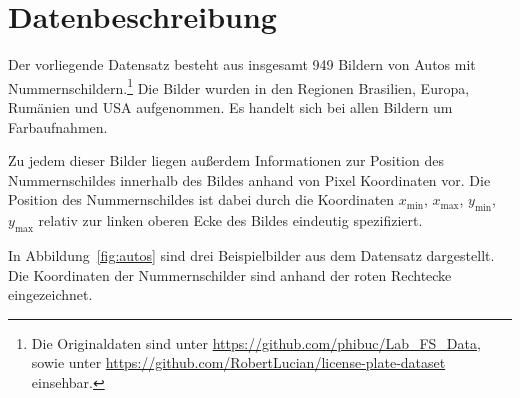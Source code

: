 \section{Datenbeschreibung}
\label{sec:Datenbeschreibung}

Der vorliegende Datensatz besteht aus insgesamt 949 Bildern von Autos mit
Nummernschildern.\footnote{Die Originaldaten sind unter \url{https://github.com/phibuc/Lab_FS_Data},
    sowie unter \url{https://github.com/RobertLucian/license-plate-dataset}
    einsehbar.}
Die Bilder wurden in den Regionen Brasilien, Europa, Rum\"anien und USA
aufgenommen. Es handelt sich bei allen Bildern um Farbaufnahmen.

Zu jedem dieser Bilder liegen au{\ss}erdem Informationen zur Position
des Nummernschildes innerhalb des Bildes anhand von Pixel Koordinaten vor.
Die Position des Nummernschildes ist dabei durch die Koordinaten
$x_{\text{min}}$, $x_{\text{max}}$, $y_{\text{min}}$, $y_{\text{max}}$
relativ zur linken oberen Ecke des Bildes eindeutig spezifiziert.

In Abbildung~\ref{fig:autos} sind drei Beispielbilder aus dem Datensatz
dargestellt. Die Koordinaten der Nummernschilder sind anhand der
roten Rechtecke eingezeichnet.

